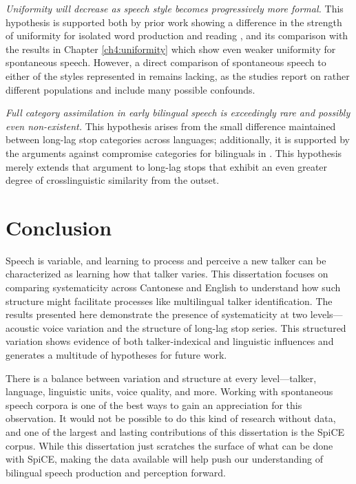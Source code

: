 \textit{Uniformity will decrease as speech style becomes progressively more formal.} This hypothesis is supported both by prior work showing a difference in the strength of uniformity for isolated word production and reading \citep{chodroff_2017_structure}, and its comparison with the results in Chapter \ref{ch4:uniformity} which show even weaker uniformity for spontaneous speech. However, a direct comparison of spontaneous speech to either of the styles represented in \citet{chodroff_2017_structure} remains lacking, as the studies report on rather different populations and include many possible confounds. 

\textit{Full category assimilation in early bilingual speech is exceedingly rare and possibly even non-existent.} This hypothesis arises from the small difference maintained between long-lag stop categories across languages; additionally, it is supported by the arguments against compromise categories for bilinguals in \citet{casillas_2021_interlingual}. This hypothesis merely extends that argument to long-lag stops that exhibit an even greater degree of crosslinguistic similarity from the outset.  

\section{Conclusion}\label{ch5:sec:conclusion}

Speech is variable, and learning to process and perceive a new talker can be characterized as learning how that talker varies. This dissertation focuses on comparing systematicity across Cantonese and English to understand how such structure might facilitate processes like multilingual talker identification. The results presented here demonstrate the presence of systematicity at two levels---acoustic voice variation and the structure of long-lag stop series. This structured variation shows evidence of both talker-indexical and linguistic influences and generates a multitude of hypotheses for future work. 

There is a balance between variation and structure at every level---talker, language, linguistic units, voice quality, and more. Working with spontaneous speech corpora is one of the best ways to gain an appreciation for this observation. It would not be possible to do this kind of research without data, and one of the largest and lasting contributions of this dissertation is the SpiCE corpus. While this dissertation just scratches the surface of what can be done with SpiCE, making the data available will help push our understanding of bilingual speech production and perception forward. 

\endinput %
